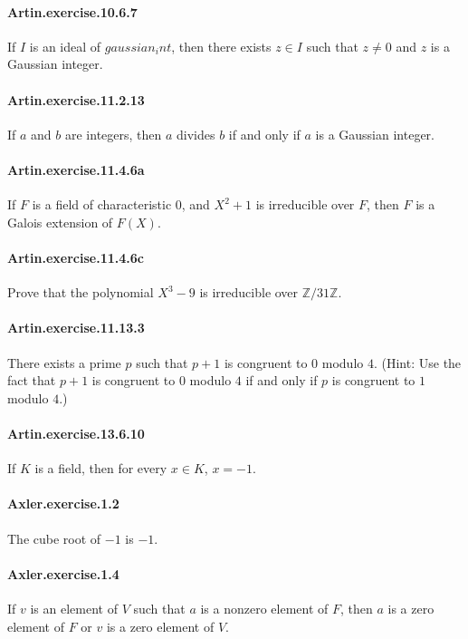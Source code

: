 \documentclass{article}
\begin{document}
\paragraph{Artin.exercise.10.6.7} If $I$ is an ideal of $gaussian_int$, then there exists $z \in I$ such that $z \neq 0$ and $z$ is a Gaussian integer.

\paragraph{Artin.exercise.11.2.13} If $a$ and $b$ are integers, then $a$ divides $b$ if and only if $a$ is a Gaussian integer.

\paragraph{Artin.exercise.11.4.6a} If $F$ is a field of characteristic $0$, and $X^2 + 1$ is irreducible over $F$, then $F$ is a Galois extension of $F(X)$.

\paragraph{Artin.exercise.11.4.6c} Prove that the polynomial $X^3 - 9$ is irreducible over $\mathbb{Z}/31\mathbb{Z}$.

\paragraph{Artin.exercise.11.13.3} There exists a prime $p$ such that $p+1$ is congruent to $0$ modulo $4$. (Hint: Use the fact that $p+1$ is congruent to $0$ modulo $4$ if and only if $p$ is congruent to $1$ modulo $4$.)

\paragraph{Artin.exercise.13.6.10} If $K$ is a field, then for every $x \in K$, $x = -1$.

\paragraph{Axler.exercise.1.2} The cube root of $-1$ is $-1$.

\paragraph{Axler.exercise.1.4} If $v$ is an element of $V$ such that $a$ is a nonzero element of $F$, then $a$ is a zero element of $F$ or $v$ is a zero element of $V$.
\end{document}
